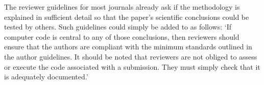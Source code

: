 The reviewer guidelines for most journals already ask if the methodology is explained in sufficient detail so that the paper's scientific conclusions could be tested by others. Such guidelines could simply be added to as follows: `If computer code is central to any of those conclusions, then reviewers should ensure that the authors are compliant with the minimum standards outlined in the author guidelines. It should be noted that reviewers are not obliged to assess or execute the code associated with a submission. They must simply check that it is adequately documented.'   
  
 
    
  
  
  
  
  
  
  
  
  
  
  
  
  
  
  
  
  
  
  
  
  